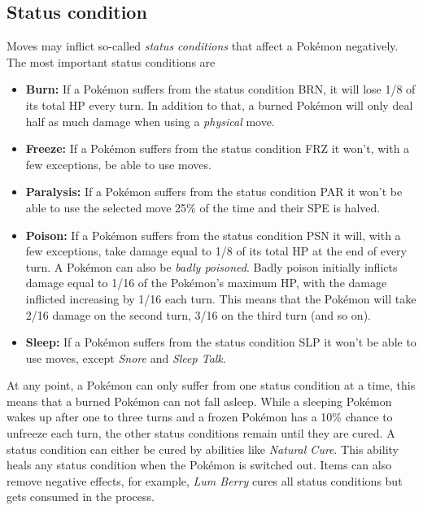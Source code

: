 \subsection{Status condition}
\label{sec:status-condition}
Moves may inflict so-called \textit{status conditions} that affect a Pokémon negatively.
The most important status conditions are
\begin{itemize}
	\item \textbf{Burn:} If a Pokémon suffers from the status condition \ac{BRN}, it will lose 1/8 of its
		total \ac{HP} every turn. In addition to that, a burned Pokémon will only deal half as much damage
		when using a \textit{physical} move.
	\item \textbf{Freeze:} If a Pokémon suffers from the status condition \ac{FRZ} it won't, with a few exceptions,
		be able to use moves. 
	\item \textbf{Paralysis:} If a Pokémon suffers from the status condition \ac{PAR} it won't be able to use 
		the selected move 25\% of the time and their \ac{SPE} is halved.
	\item \textbf{Poison:} If a Pokémon suffers from the status condition \ac{PSN} it will, with a few exceptions,
		take damage equal to 1/8 of its total \ac{HP} at the end of every turn. A Pokémon can also be 
		\textit{badly poisoned}. Badly poison initially inflicts damage equal to 1/16 of the Pokémon's maximum
		\ac{HP}, with the damage inflicted increasing by 1/16 each turn. This means that the Pokémon will
		take 2/16 damage on the second turn, 3/16 on the third turn (and so on).
	\item \textbf{Sleep:} If a Pokémon suffers from the status condition \ac{SLP} it won't be able to use moves,
		except \textit{Snore} and \textit{Sleep Talk}. 
\end{itemize}

At any point, a Pokémon can only suffer from one status condition at a time, this means that a 
burned Pokémon can not fall asleep. While a sleeping Pokémon wakes up after one to three turns and a 
frozen Pokémon has a 10\% chance to unfreeze each turn, the other status conditions remain until they are 
cured. A status condition can either be cured by abilities like \textit{Natural Cure}. This ability
heals any status condition when the Pokémon is switched out. Items can also remove negative effects,
for example, \textit{Lum Berry} cures all status conditions but gets consumed in the process. \\

